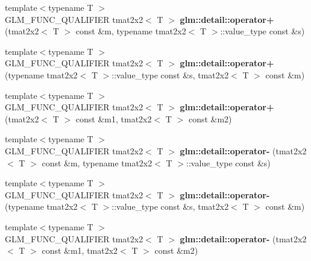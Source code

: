 \begin{DoxyCompactItemize}
\item 
\hypertarget{namespaceglm_1_1detail_a9cffdd7bde333fedc1d9505bf98cf795}{{\footnotesize template$<$typename T $>$ }\\G\-L\-M\-\_\-\-F\-U\-N\-C\-\_\-\-Q\-U\-A\-L\-I\-F\-I\-E\-R tmat2x2$<$ T $>$ {\bfseries glm\-::detail\-::operator+} (tmat2x2$<$ T $>$ const \&m, typename tmat2x2$<$ T $>$\-::value\-\_\-type const \&s)}\label{namespaceglm_1_1detail_a9cffdd7bde333fedc1d9505bf98cf795}

\item 
\hypertarget{namespaceglm_1_1detail_a7992c910426c0bf977c3d3d60f3eabdd}{{\footnotesize template$<$typename T $>$ }\\G\-L\-M\-\_\-\-F\-U\-N\-C\-\_\-\-Q\-U\-A\-L\-I\-F\-I\-E\-R tmat2x2$<$ T $>$ {\bfseries glm\-::detail\-::operator+} (typename tmat2x2$<$ T $>$\-::value\-\_\-type const \&s, tmat2x2$<$ T $>$ const \&m)}\label{namespaceglm_1_1detail_a7992c910426c0bf977c3d3d60f3eabdd}

\item 
\hypertarget{namespaceglm_1_1detail_a70c7e6874253adcbdbd7203deaf51b79}{{\footnotesize template$<$typename T $>$ }\\G\-L\-M\-\_\-\-F\-U\-N\-C\-\_\-\-Q\-U\-A\-L\-I\-F\-I\-E\-R tmat2x2$<$ T $>$ {\bfseries glm\-::detail\-::operator+} (tmat2x2$<$ T $>$ const \&m1, tmat2x2$<$ T $>$ const \&m2)}\label{namespaceglm_1_1detail_a70c7e6874253adcbdbd7203deaf51b79}

\item 
\hypertarget{namespaceglm_1_1detail_a3098613ac2f602071aa93bacaede3533}{{\footnotesize template$<$typename T $>$ }\\G\-L\-M\-\_\-\-F\-U\-N\-C\-\_\-\-Q\-U\-A\-L\-I\-F\-I\-E\-R tmat2x2$<$ T $>$ {\bfseries glm\-::detail\-::operator-\/} (tmat2x2$<$ T $>$ const \&m, typename tmat2x2$<$ T $>$\-::value\-\_\-type const \&s)}\label{namespaceglm_1_1detail_a3098613ac2f602071aa93bacaede3533}

\item 
\hypertarget{namespaceglm_1_1detail_ac06f804905b461239bba40d9c5cc0999}{{\footnotesize template$<$typename T $>$ }\\G\-L\-M\-\_\-\-F\-U\-N\-C\-\_\-\-Q\-U\-A\-L\-I\-F\-I\-E\-R tmat2x2$<$ T $>$ {\bfseries glm\-::detail\-::operator-\/} (typename tmat2x2$<$ T $>$\-::value\-\_\-type const \&s, tmat2x2$<$ T $>$ const \&m)}\label{namespaceglm_1_1detail_ac06f804905b461239bba40d9c5cc0999}

\item 
\hypertarget{namespaceglm_1_1detail_a31554eb2b8009270f740f822146ff67d}{{\footnotesize template$<$typename T $>$ }\\G\-L\-M\-\_\-\-F\-U\-N\-C\-\_\-\-Q\-U\-A\-L\-I\-F\-I\-E\-R tmat2x2$<$ T $>$ {\bfseries glm\-::detail\-::operator-\/} (tmat2x2$<$ T $>$ const \&m1, tmat2x2$<$ T $>$ const \&m2)}\label{namespaceglm_1_1detail_a31554eb2b8009270f740f822146ff67d}


\end{DoxyCompactItemize}
